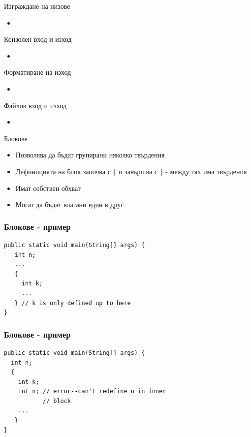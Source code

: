 \documentclass{beamer}
\begin{document}
\begin{frame}{Изграждане на низове}
  \transdissolve
  \begin{itemize}
  \item 
  \end{itemize}
\end{frame}

\begin{frame}{Конзолен вход и изход}
  \transdissolve
  \begin{itemize}
  \item 
  \end{itemize}
\end{frame}

\begin{frame}{Форматиране на изход}
  \transdissolve
  \begin{itemize}
  \item 
  \end{itemize}
\end{frame}

\begin{frame}{Файлов вход и изход}
  \transdissolve
  \begin{itemize}
  \item 
  \end{itemize}
\end{frame}


\begin{frame}{Блокове}
  \transdissolve
  \begin{itemize}
  \item Позволява да бъдат групирани няколко
    твърдения
   \item Дефиницията на блок започва с \{ и
      завършва с \} - между тях има
    твърдения
   \item Имат собствен обхват
   \item Могат да бъдат влагани един в друг
  \end{itemize}
\end{frame}

\begin{frame}[fragile]
  \transdissolve
  \frametitle{Блокове - пример}
\begin{lstlisting}
public static void main(String[] args) {
   int n;
   ...
   {
     int k;
     ... 
   } // k is only defined up to here
}
\end{lstlisting}
\end{frame}

\begin{frame}[fragile]
  \frametitle{Блокове - пример}
  \transdissolve
\begin{lstlisting}
public static void main(String[] args) {
  int n;
  {
    int k;
    int n; // error--can't redefine n in inner
           // block
    ...
   } 
}
\end{lstlisting}
\end{frame}
\end{document}
